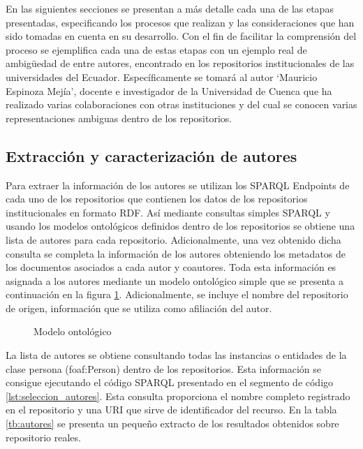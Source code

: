 \documentclass[conference]{IEEEtran}
\begin{document}
En las siguientes secciones se presentan  a más detalle cada una de las etapas presentadas, especificando los procesos que realizan y las consideraciones que han sido tomadas en cuenta en su desarrollo.  Con el fin de facilitar la comprensión del proceso se ejemplifica cada una de estas etapas con un ejemplo real de ambigüedad de entre autores, encontrado en los repositorios institucionales de las universidades del Ecuador.  Específicamente se tomará al autor ‘Mauricio Espinoza Mejía’, docente e investigador de la Universidad de Cuenca que ha realizado varias colaboraciones con otras instituciones y del cual se conocen varias representaciones ambiguas dentro de los repositorios.

\subsection{Extracción y caracterización de autores}
Para extraer la información de los autores se utilizan los SPARQL Endpoints de cada uno de los repositorios que contienen los datos de los repositorios institucionales en formato RDF. Así mediante consultas simples SPARQL y usando los modelos ontológicos definidos dentro de los repositorios se obtiene una lista de autores para cada repositorio. Adicionalmente, una vez obtenido dicha consulta se completa  la información de los autores obteniendo los metadatos de los  documentos asociados a cada autor y coautores. Toda esta información es asignada a los autores mediante un modelo ontológico simple que se presenta a continuación en la figura \ref{fig:modelo_ontologico}. Adicionalmente, se incluye el nombre del repositorio de origen, información que se utiliza como afiliación del autor.

\begin{figure}[!t]
\centering
\caption{Modelo ontol\'ogico}
\label{fig:modelo_ontologico}
\end{figure}

La lista de autores se obtiene consultando todas las instancias o entidades de la clase persona (foaf:Person) dentro de los repositorios. Esta información se consigue ejecutando el código SPARQL presentado en el segmento de código \ref{lst:seleccion_autores}. Esta consulta proporciona el nombre completo registrado en el repositorio y una URI que sirve de identificador del recurso. En la tabla \ref{tb:autores} se presenta un pequeño extracto de los resultados obtenidos sobre repositorio reales.
\end{document}

